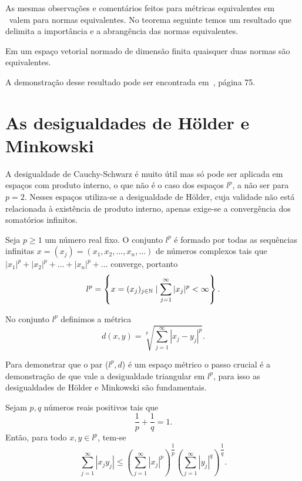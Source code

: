 \documentclass[glenn,refnum,codigo]{Estilo}
\begin{document}
As mesmas observações e comentários feitos para métricas equivalentes em \rn\
valem para normas equivalentes. No teorema seguinte temos um resultado que
delimita a importância e a abrangência das normas equivalentes.

\begin{teorema}
	Em um espaço vetorial normado de dimensão finita quaisquer duas normas
	são equivalentes.
\end{teorema}

\begin{prova}
	A demonstração desse resultado pode ser encontrada em~\cite{kreyszig},
	página 75.
\end{prova}

\section{As desigualdades de H\"{o}lder e Minkowski}

A desigualdade de Cauchy-Schwarz é muito útil mas só pode ser aplicada em
espaços com produto interno, o que não é o caso dos espaços $l^p$, a não ser
para $p=2$. Nesses espaços utiliza-se a desigualdade de H\"{o}lder, cuja
validade não está relacionada à existência de produto interno, apenas exige-se
a convergência dos somatórios infinitos.

\begin{define}[Espaço $l^p$]
	Seja $p\geqslant1$ um número real fixo. O conjunto $l^p$ é formado por todas as
	sequências infinitas $x=(x_j)=(x_1,x_2,\ldots,x_n,\ldots)$ de números complexos
	tais que $|x_1|^p+|x_2|^p+\ldots+|x_n|^p+\ldots$ converge, portanto
	\[
	l^p = \left\{x=(x_j)_{j\in\mathbb{N}}\mid \sum_{j=1}^{\infty}|x_j|^p < \infty\right\}.
	\]
\end{define}

No conjunto $l^p$ definimos a métrica
\[
d(x,y)= \sqrt[p]{\sum_{j=1}^{\infty}|x_j - y_j|^p}.
\]

Para demonstrar que o par ($l^p, d$) é um espaço métrico o passo crucial é a
demonstração de que vale a desigualdade triangular em $l^p$, para isso as
desigualdades de H\"{o}lder e Minkowski são fundamentais.

\begin{teorema}
	Sejam $p,q$ números reais positivos tais que
	\[
	\dfrac{1}{p}+\dfrac{1}{q}=1.
	\]
	Então, para todo $x,y\in l^p$, tem-se
	\[
	  \sum_{j=1}^{\infty}|x_j y_j| \leqslant
	  \left(\sum_{j=1}^{\infty}|x_j|^p\right)^{\dfrac{1}{p}}
	  \left(\sum_{j=1}^{\infty}
	  |y_j|^q\right)^{\dfrac{1}{q}}.
	\]
\end{teorema}
\end{document}
